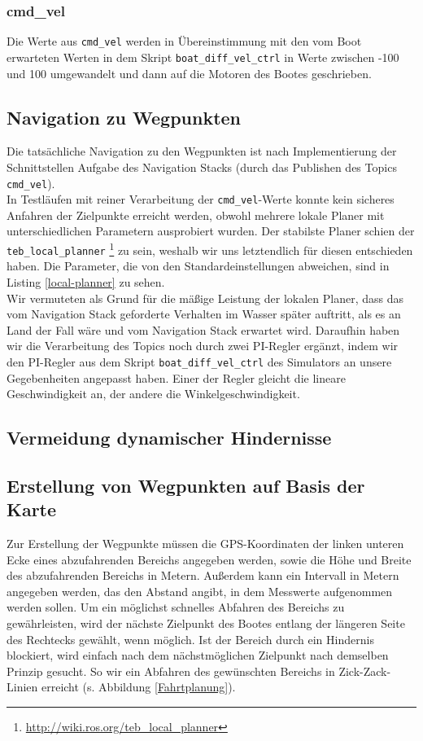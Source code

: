 \documentclass[11pt]{article}
\begin{document}
\subsubsection{cmd\_vel} \label{cmd}
Die Werte aus \texttt{cmd\_vel} werden in Übereinstimmung mit den vom Boot erwarteten Werten in dem Skript \texttt{boat\_diff\_vel\_ctrl} in Werte zwischen -100 und 100 umgewandelt und dann auf die Motoren des Bootes geschrieben.

\subsection{Navigation zu Wegpunkten}

Die tatsächliche Navigation zu den Wegpunkten ist nach Implementierung der Schnittstellen Aufgabe des Navigation Stacks (durch das Publishen des Topics \texttt{cmd\_vel}).\\
In Testläufen mit reiner Verarbeitung der \texttt{cmd\_vel}-Werte konnte kein sicheres Anfahren der Zielpunkte erreicht werden, obwohl mehrere lokale Planer mit unterschiedlichen Parametern ausprobiert wurden. Der stabilste Planer schien der \texttt{teb\_local\_planner} \footnote{\url{http://wiki.ros.org/teb_local_planner}} zu sein, weshalb wir uns letztendlich für diesen entschieden haben. Die Parameter, die von den Standardeinstellungen abweichen, sind in Listing \ref{local-planner} zu sehen.\\

Wir vermuteten als Grund für die mäßige Leistung der lokalen Planer, dass das vom Navigation Stack geforderte Verhalten im Wasser später auftritt, als es an Land der Fall wäre und vom Navigation Stack erwartet wird. Daraufhin haben wir die Verarbeitung des Topics noch durch zwei PI-Regler ergänzt, indem wir den PI-Regler aus dem Skript \texttt{boat\_diff\_vel\_ctrl} des Simulators an unsere Gegebenheiten angepasst haben. Einer der Regler gleicht die lineare Geschwindigkeit an, der andere die Winkelgeschwindigkeit.

\subsection{Vermeidung dynamischer Hindernisse}


\subsection{Erstellung von Wegpunkten auf Basis der Karte}
Zur Erstellung der Wegpunkte müssen die GPS-Koordinaten der linken unteren Ecke eines abzufahrenden Bereichs angegeben werden, sowie die Höhe und Breite des abzufahrenden Bereichs in Metern. Außerdem kann ein Intervall in Metern angegeben werden, das den Abstand angibt, in dem Messwerte aufgenommen werden sollen. Um ein möglichst schnelles Abfahren des Bereichs zu gewährleisten, wird der nächste Zielpunkt des Bootes entlang der längeren Seite des Rechtecks gewählt, wenn möglich. Ist der Bereich durch ein Hindernis blockiert, wird einfach nach dem nächstmöglichen Zielpunkt nach demselben Prinzip gesucht. So wir ein Abfahren des gewünschten Bereichs in Zick-Zack-Linien erreicht (s. Abbildung \ref{Fahrtplanung}).
\end{document}
